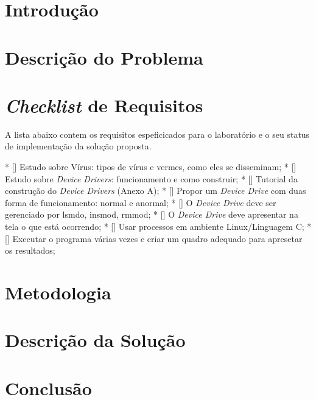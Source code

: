 \section{Introdução}

\section{Descrição do Problema}

\section{\textit{Checklist} de Requisitos}

A lista abaixo contem os requisitos espeficicados para o laboratório e o
seu status de implementação da solução proposta.

* [] Estudo sobre Vírus: tipos de vírus e vermes, como eles se disseminam;
* [] Estudo sobre \textit{Device Drivers}: funcionamento e como construir;
* [] Tutorial da construção do \textit{Device Drivers} (Anexo A);
* [] Propor um \textit{Device Drive} com duas forma de funcionamento: normal e anormal;
* [] O \textit{Device Drive} deve ser gerenciado por lsmdo, insmod, rmmod;
* [] O \textit{Device Drive} deve apresentar na tela o que está ocorrendo;
* [] Usar processos em ambiente Linux/Linguagem C;
* [] Executar o programa várias vezes e criar um quadro adequado para apresetar os resultados;

\section{Metodologia}

\section{Descrição da Solução}

\section{Conclusão}


